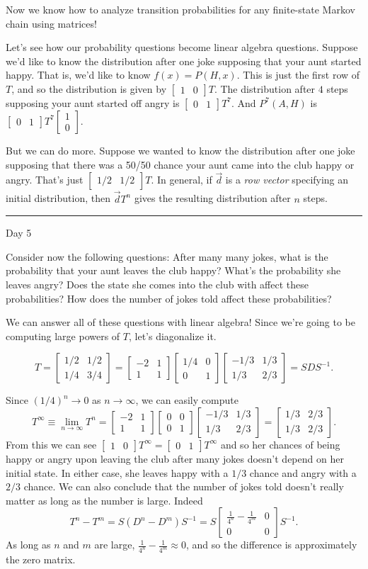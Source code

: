 \documentclass{problemset}
\newcommand{\mat}[1]{\begin{bmatrix}#1\end{bmatrix}}
\newcommand{\1}{\mathbf{1}}
\newcommand{\fatrule}[1]{\vspace{.3cm}\hrule {\hfill \sf #1}\par}
\begin{document}
	Now we know how to analyze transition probabilities for 
	any finite-state Markov chain using matrices!

	Let's see how our probability questions become linear algebra questions.  Suppose we'd like
	to know the distribution after one joke supposing that your aunt started happy.  That
	is, we'd like to know $f(x) = P(H,x)$.  This is just the first row of $T$, and so the distribution
	is given by $\mat{1&0}T$.  The distribution after $4$ steps supposing your aunt started off
	angry is $\mat{0&1}T^7$.  And $P^7(A,H)$ is $\mat{0&1}T^7\mat{1\\0}$.

	But we can do more.  Suppose we wanted to know the distribution after one joke supposing that
	there was a 50/50 chance your aunt came into the club happy or angry.  That's just 
	$\mat{1/2&1/2}T$.  In general, if $\vec d$ is a \emph{row vector} specifying an initial
	distribution, then $\vec dT^n$ gives the resulting distribution after $n$ steps.

	\fatrule{Day 5}

	Consider now the following questions: After many many jokes, what is the probability that your aunt
	leaves the club happy?  What's the probability she leaves angry?  Does the state she comes into the club
	with affect these probabilities?  How does the number of jokes told affect these probabilities?

	We can answer all of these questions with linear algebra!  Since we're going to be computing large
	powers of $T$, let's diagonalize it.

	\[
		T = \mat{1/2&1/2\\ 1/4 & 3/4} =
		\mat{-2& 1\\ 1& 1} \mat{1/4 & 0\\ 0& 1}\mat{-1/3 & 1/3 \\ 1/3& 2/3} = SDS^{-1}.
	\]

	Since $(1/4)^n\to 0$ as $n\to \infty$, we can easily compute
	\[
		T^\infty\equiv \lim_{n\to\infty} T^n = 
		\mat{-2& 1\\ 1& 1} \mat{0 & 0\\ 0& 1}\mat{-1/3 & 1/3 \\ 1/3& 2/3} = \mat{1/3&2/3\\1/3&2/3}.
	\]
	From this we can see $\mat{1 & 0}T^\infty = \mat{0&1}T^\infty$ and so her chances of being
	happy or angry upon leaving the club after many jokes doesn't depend on her initial state.  In
	either case, she leaves happy with a $1/3$ chance and angry with a $2/3$ chance.  We can also conclude
	that the number of jokes told doesn't really matter as long as the number is large.
	Indeed
	\[
		T^n-T^m = S(D^n-D^m)S^{-1} = S\mat{ \frac{1}{4^n}-\frac{1}{4^m} & 0 \\0 & 0}S^{-1}.
	\]
	As long as $n$ and $m$ are large, $\frac{1}{4^n}-\frac{1}{4^m}\approx 0$, and so the difference is
	approximately the zero matrix.
\end{document}
